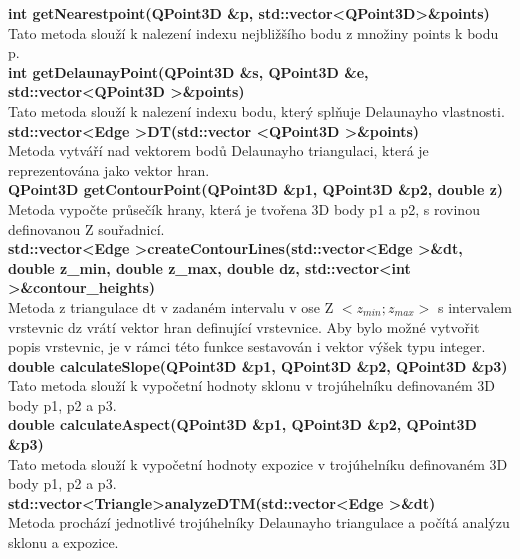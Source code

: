 \documentclass[a4paper,11pt,twoside]{article}
\begin{document}
\noindent\textbf{int getNearestpoint(QPoint3D \&p, std::vector\textless QPoint3D\textgreater \&points)}\\
Tato metoda slouží k nalezení indexu nejbližšího bodu z množiny points k bodu p.\\

\noindent\textbf{int getDelaunayPoint(QPoint3D \&s, QPoint3D \&e, std::vector\textless QPoint3D \textgreater \&points)}\\
Tato metoda slouží k nalezení indexu bodu, který splňuje Delaunayho vlastnosti.\\

\noindent\textbf{std::vector\textless Edge \textgreater DT(std::vector \textless QPoint3D \textgreater \&points)}\\
Metoda vytváří nad vektorem bodů Delaunayho triangulaci, která je reprezentována jako vektor hran.\\

\noindent\textbf{QPoint3D getContourPoint(QPoint3D \&p1, QPoint3D \&p2, double z)}\\
Metoda vypočte průsečík hrany, která je tvořena 3D body p1 a p2, s rovinou definovanou Z souřadnicí.\\

\noindent\textbf{std::vector\textless Edge \textgreater createContourLines(std::vector\textless Edge \textgreater \&dt, double z\_min, double z\_max, double dz, std::vector\textless int \textgreater \&contour\_heights)}\\
Metoda z triangulace dt v zadaném intervalu v ose Z $<z_{min} ; z_{max}>$ s intervalem vrstevnic dz vrátí vektor hran definující vrstevnice. Aby bylo možné vytvořit popis vrstevnic, je v rámci této funkce sestavován i vektor výšek typu integer. \\

\noindent\textbf{double calculateSlope(QPoint3D \&p1, QPoint3D \&p2, QPoint3D \&p3)}\\
Tato metoda slouží k vypočetní hodnoty sklonu v trojúhelníku definovaném 3D body p1, p2 a p3.\\

\noindent\textbf{double calculateAspect(QPoint3D \&p1, QPoint3D \&p2, QPoint3D \&p3)}\\
Tato metoda slouží k vypočetní hodnoty expozice v trojúhelníku definovaném 3D body p1, p2 a p3.\\

\noindent\textbf{std::vector\textless Triangle\textgreater analyzeDTM(std::vector\textless Edge \textgreater \&dt)}\\
Metoda prochází jednotlivé trojúhelníky Delaunayho triangulace a počítá analýzu sklonu a expozice. \\
\end{document}
